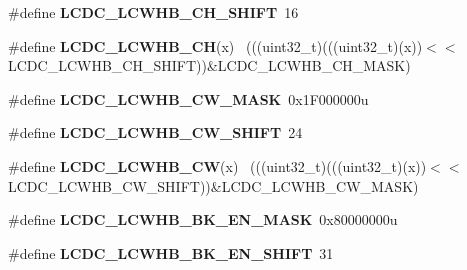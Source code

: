 \begin{DoxyCompactItemize}
\item 
\hypertarget{group___l_c_d_c___register___masks_gae92ad4014b05ee16762f03924309de0d}{}\#define {\bfseries L\+C\+D\+C\+\_\+\+L\+C\+W\+H\+B\+\_\+\+C\+H\+\_\+\+S\+H\+I\+F\+T}~16\label{group___l_c_d_c___register___masks_gae92ad4014b05ee16762f03924309de0d}

\item 
\hypertarget{group___l_c_d_c___register___masks_ga6d96411a880e25a215fb391b772f32bb}{}\#define {\bfseries L\+C\+D\+C\+\_\+\+L\+C\+W\+H\+B\+\_\+\+C\+H}(x)                                              ~(((uint32\+\_\+t)(((uint32\+\_\+t)(x))$<$$<$L\+C\+D\+C\+\_\+\+L\+C\+W\+H\+B\+\_\+\+C\+H\+\_\+\+S\+H\+I\+F\+T))\&L\+C\+D\+C\+\_\+\+L\+C\+W\+H\+B\+\_\+\+C\+H\+\_\+\+M\+A\+S\+K)\label{group___l_c_d_c___register___masks_ga6d96411a880e25a215fb391b772f32bb}

\item 
\hypertarget{group___l_c_d_c___register___masks_ga10b93cb6e75fe02a50159dbef8e78f7c}{}\#define {\bfseries L\+C\+D\+C\+\_\+\+L\+C\+W\+H\+B\+\_\+\+C\+W\+\_\+\+M\+A\+S\+K}~0x1\+F000000u\label{group___l_c_d_c___register___masks_ga10b93cb6e75fe02a50159dbef8e78f7c}

\item 
\hypertarget{group___l_c_d_c___register___masks_ga013795af8a67dcd34ca6fc4fa04a75e6}{}\#define {\bfseries L\+C\+D\+C\+\_\+\+L\+C\+W\+H\+B\+\_\+\+C\+W\+\_\+\+S\+H\+I\+F\+T}~24\label{group___l_c_d_c___register___masks_ga013795af8a67dcd34ca6fc4fa04a75e6}

\item 
\hypertarget{group___l_c_d_c___register___masks_gab3b0257c3142a2f15bca6de6b7326c96}{}\#define {\bfseries L\+C\+D\+C\+\_\+\+L\+C\+W\+H\+B\+\_\+\+C\+W}(x)                                              ~(((uint32\+\_\+t)(((uint32\+\_\+t)(x))$<$$<$L\+C\+D\+C\+\_\+\+L\+C\+W\+H\+B\+\_\+\+C\+W\+\_\+\+S\+H\+I\+F\+T))\&L\+C\+D\+C\+\_\+\+L\+C\+W\+H\+B\+\_\+\+C\+W\+\_\+\+M\+A\+S\+K)\label{group___l_c_d_c___register___masks_gab3b0257c3142a2f15bca6de6b7326c96}

\item 
\hypertarget{group___l_c_d_c___register___masks_gad60c8f8e88478afdaeae311e408aeee1}{}\#define {\bfseries L\+C\+D\+C\+\_\+\+L\+C\+W\+H\+B\+\_\+\+B\+K\+\_\+\+E\+N\+\_\+\+M\+A\+S\+K}~0x80000000u\label{group___l_c_d_c___register___masks_gad60c8f8e88478afdaeae311e408aeee1}

\item 
\hypertarget{group___l_c_d_c___register___masks_gadbd2e439afb53039714ca5a7dc226ab0}{}\#define {\bfseries L\+C\+D\+C\+\_\+\+L\+C\+W\+H\+B\+\_\+\+B\+K\+\_\+\+E\+N\+\_\+\+S\+H\+I\+F\+T}~31\label{group___l_c_d_c___register___masks_gadbd2e439afb53039714ca5a7dc226ab0}


\end{DoxyCompactItemize}
